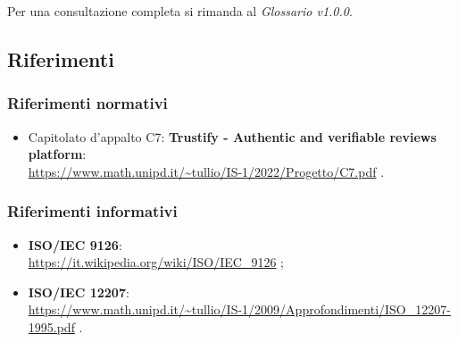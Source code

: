Per una consultazione completa si rimanda al \textit{Glossario v1.0.0}.

\subsection{Riferimenti}
\subsubsection{Riferimenti normativi}
\begin{itemize}
    \item Capitolato d'appalto C7: \textbf{Trustify - Authentic and verifiable reviews platform}: \\
          \url{https://www.math.unipd.it/~tullio/IS-1/2022/Progetto/C7.pdf} \hfill{}.
\end{itemize}
\subsubsection{Riferimenti informativi}
\begin{itemize}
    \item \textbf{ISO/IEC 9126}: \\
          \url{https://it.wikipedia.org/wiki/ISO/IEC_9126} \hfill{};
    \item \textbf{ISO/IEC 12207}: \\
          \url{https://www.math.unipd.it/~tullio/IS-1/2009/Approfondimenti/ISO_12207-1995.pdf} \hfill{}.
\end{itemize}